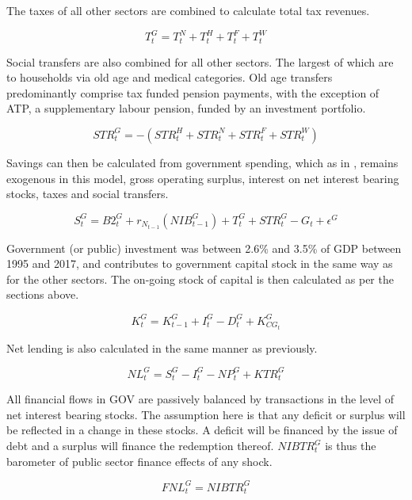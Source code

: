 \documentclass[
]{book}
\begin{document}
The taxes of all other sectors are combined to calculate total tax revenues.

\begin{equation}
T^G_t = T^N_t + T^H_t + T^F_t + T^W_t
\end{equation}

Social transfers are also combined for all other sectors. The largest
of which are to households via old age and medical categories. Old age
transfers predominantly comprise tax funded pension payments, with the exception
of ATP, a supplementary labour pension, funded by an investment portfolio.

\begin{equation}
STR^G_t = -(STR^H_t + STR^N_t + STR^F_t + STR^W_t )
\end{equation}

Savings can then be calculated from government spending, which as
in \citet{byrialsenraza2019empirical}, remains exogenous in this model,
gross operating surplus, interest on net interest bearing stocks,
taxes and social transfers.

\begin{equation}
S^G_t= B2^G_t + r_{N_{t-1}}(NIB^G_{t-1}) + T^G_t+ STR^G_t - G_t + \epsilon ^G
\end{equation}

Government (or public) investment was between 2.6\% and 3.5\% of GDP between
1995 and 2017, and contributes to government capital stock in the same way
as for the other sectors. The on-going stock of capital is then calculated as per the
sections above.

\begin{equation}
K^G_t= K^G_{t-1} + I^G_t- D^G_t+ K^G_{CG_t}
\end{equation}

Net lending is also calculated in the same manner as previously.

\begin{equation}
NL^G_t = S^G_t - I^G_t - NP^G_t + KTR^G_t
\end{equation}

All financial flows in GOV are passively balanced by transactions in the level of net
interest bearing stocks. The assumption here is that any deficit or surplus will be
reflected in a change in these stocks. A deficit will be financed by the issue of debt
and a surplus will finance the redemption thereof.
\(NIBTR^G_t\) is thus the barometer of public sector finance effects of any shock.

\begin{equation}
FNL^G_t= NIBTR^G_t
\end{equation}
\end{document}
